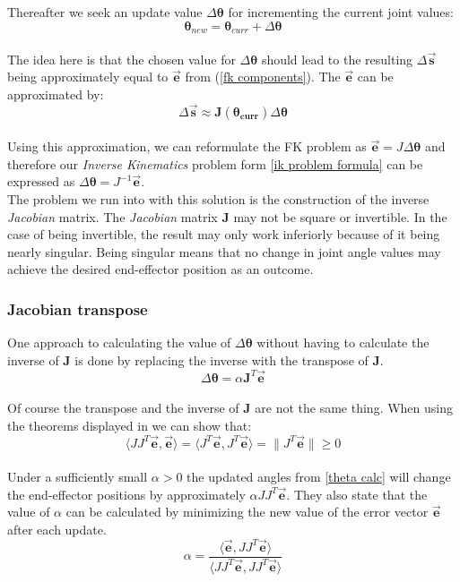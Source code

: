 Thereafter we seek an update value $\Delta\pmb{\theta}$ for incrementing the current joint values:\\
\begin{equation}
\label{theta calc}
\pmb{\theta}_{new}=\pmb{\theta}_{curr}+\Delta\pmb{\theta}
\end{equation}
\\The idea here is that the chosen value for $\Delta\pmb{\theta}$ should lead to the resulting $\Delta\pmb{\vec{s}}$ being approximately equal to $\vec{\textbf{e}}$ from (\ref{fk components}). The $\vec{\textbf{e}}$ can be approximated by:\\
\begin{equation}
\label{delta s approx}
\Delta\pmb{\vec{s}}\approx \pmb{J(\theta_{curr})}\Delta\pmb{\theta}
\end{equation}
\\Using this approximation, we can reformulate the FK problem as $\pmb{}\vec{\pmb{e}}=J\Delta\pmb{\theta}$ and therefore our \textit{Inverse Kinematics} problem form \ref{ik problem formula} can be expressed as $ \Delta\pmb{\theta}=J^{-1}\vec{\pmb{e}}$. \\The problem we run into with this solution is the construction of the inverse \textit{Jacobian} matrix. The \textit{Jacobian} matrix \textbf{J} may not be square or invertible. In the case of being invertible, the result may only work inferiorly because of it being nearly singular. Being singular means that no change in joint angle values may achieve the desired end-effector position as an outcome.
\subsubsection{Jacobian transpose}
One approach to calculating the value of $\Delta\pmb{\theta}$ without having to calculate the inverse of \textbf{J} is done by replacing the inverse with the transpose of \textbf{J}.\\
\begin{equation}
\label{delta theta transpose}
\Delta\pmb{\theta}=\alpha \pmb{J}^{T}\vec{\pmb{e}}
\end{equation}
\\Of course the transpose and the inverse of \textbf{J} are not the same thing. When using the theorems displayed in \cite{Orin.1984,Wolovich.1984} we can show that:\\ 
\begin{equation}
\label{transpose show}
\langle JJ^{T}\vec{\pmb{e}},\vec{\pmb{e}}\rangle=\langle J^{T}\vec{\pmb{e}},J^{T}\vec{\pmb{e}}\rangle=\|J^{T}\vec{\pmb{e}}\|\geq 0
\end{equation}
\\Under a sufficiently small $\alpha>0$ the updated angles from \ref{theta calc} will change the end-effector positions by approximately $\alpha JJ^{T}\vec{\pmb{e}}$. They also state that the value of $\alpha$ can be calculated by minimizing the new value of the error vector $\vec{\pmb{e}}$ after each update.\\
\begin{equation}
\label{transpose alpha}
\alpha=\frac{\langle\vec{\pmb{e}},JJ^{T}\vec{\pmb{e}}\rangle}{\langle JJ^{T}\vec{\pmb{e}},JJ^{T}\vec{\pmb{e}}\rangle}
\end{equation}
